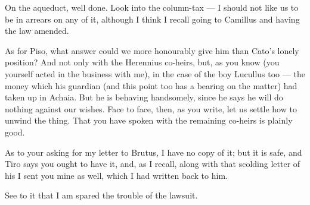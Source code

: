 

 On the aqueduct, well done. Look into the column-tax --- I should not like us to be in arrears on any of it, although I think I recall going to Camillus and having the law amended.

 As for Piso, what answer could we more honourably give him than Cato's lonely position? And not only with the Herennius co-heirs, but, as you know (you yourself acted in the business with me), in the case of the boy Lucullus too --- the money which his guardian (and this point too has a bearing on the matter) had taken up in Achaia. But he is behaving handsomely, since he says he will do nothing against our wishes. Face to face, then, as you write, let us settle how to unwind the thing. That you have spoken with the remaining co-heirs is plainly good.

 As to your asking for my letter to Brutus, I have no copy of it; but it is safe, and Tiro says you ought to have it, and, as I recall, along with that scolding letter of his I sent you mine as well, which I had written back to him.

 See to it that I am spared the trouble of the lawsuit.
